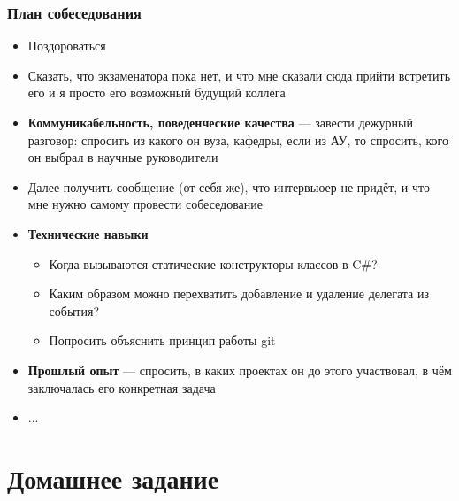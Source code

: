 \documentclass{../../slides-style}
\begin{document}
    \begin{frame}
        \frametitle{План собеседования}
        \begin{small}
            \begin{itemize}
                \item Поздороваться
                \item Сказать, что экзаменатора пока нет, и что мне сказали сюда прийти встретить его и я просто его возможный будущий коллега
                \item \textbf{Коммуникабельность, поведенческие качества} --- завести дежурный разговор: спросить из какого он вуза, кафедры, если из АУ, то спросить, кого он выбрал в научные руководители
                \item Далее получить сообщение (от себя же), что интервьюер не придёт, и что мне нужно самому провести собеседование
                \item \textbf{Технические навыки}
                \begin{itemize}
                    \item ​Когда вызываются статические конструкторы классов в C\#?
                    \item Каким образом можно перехватить добавление и удаление делегата из события?
                    \item Попросить объяснить принцип работы git
                \end{itemize}
                \item \textbf{Прошлый опыт} --- спросить, в каких проектах он до этого участвовал, в чём заключалась его конкретная задача
                \item ...
            \end{itemize}
        \end{small}
    \end{frame}

    \section{Домашнее задание}
\end{document}
